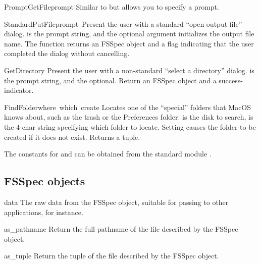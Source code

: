 \begin{funcdesc}{PromptGetFile}{prompt}
Similar to  but allows you to specify a prompt.
\end{funcdesc}

\begin{funcdesc}{StandardPutFile}{prompt\, }
Present the user with a standard ``open output file''
dialog.  is the prompt string, and the optional
 argument initializes the output file name. The function
returns an FSSpec object and a flag indicating that the user completed
the dialog without cancelling.
\end{funcdesc}

\begin{funcdesc}{GetDirectory}{}
Present the user with a non-standard ``select a directory''
dialog.  is the prompt string, and the optional.
Return an FSSpec object and a success-indicator.
\end{funcdesc}

\begin{funcdesc}{FindFolder}{where\, which\, create}
Locates one of the ``special'' folders that MacOS knows about, such as
the trash or the Preferences folder.  is the disk to
search,  is the 4-char string specifying which folder to
locate. Setting  causes the folder to be created if it
does not exist. Returns a  tuple.

The constants for  and  can be obtained from the
standard module .
\end{funcdesc}

\subsection{FSSpec objects}

\renewcommand{\indexsubitem}{(FSSpec object attribute)}
\begin{datadesc}{data}
The raw data from the FSSpec object, suitable for passing
to other applications, for instance.
\end{datadesc}

\renewcommand{\indexsubitem}{(FSSpec object method)}
\begin{funcdesc}{as_pathname}{}
Return the full pathname of the file described by the FSSpec object.
\end{funcdesc}

\begin{funcdesc}{as_tuple}{}
Return the  tuple of the file described
by the FSSpec object.
\end{funcdesc}


